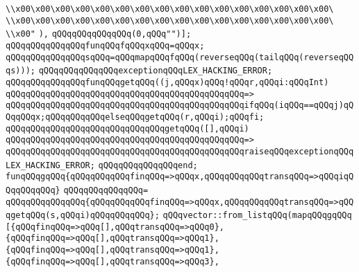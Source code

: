 \verb|\\x00\x00\x00\x00\x00\x00\x00\x00\x00\x00\x00\x00\x00\x00\x00\x00\|\newline
\verb|\\x00\x00\x00\x00\x00\x00\x00\x00\x00\x00\x00\x00\x00\x00\x00\x00\|\newline
\verb|\\x00"|\newline
\verb|),|\newline
\verb|qQQqqQQqqQQqqQQq(0,qQQq"")];|\newline
\verb|qQQqqQQqqQQqqQQqfunqQQqfqQQqxqQQq=qQQqx;|\newline
\verb|qQQqqQQqqQQqqQQqsqQQq=qQQqmapqQQqfqQQq(reverseqQQq(tailqQQq(reverseqQQqs)));|\newline
\verb|qQQqqQQqqQQqqQQqexceptionqQQqLEX_HACKING_ERROR;|\newline
\verb|qQQqqQQqqQQqqQQqfunqQQqgetqQQq((j,qQQqx)qQQq!qQQqr,qQQqi:qQQqInt)|\newline
\verb|qQQqqQQqqQQqqQQqqQQqqQQqqQQqqQQqqQQqqQQqqQQqqQQq=>|\newline
\verb|qQQqqQQqqQQqqQQqqQQqqQQqqQQqqQQqqQQqqQQqqQQqqQQqifqQQq(iqQQq==qQQqj)qQQqqQQqx;qQQqqQQqqQQqelseqQQqgetqQQq(r,qQQqi);qQQqfi;|\newline
\newline
\verb|qQQqqQQqqQQqqQQqqQQqqQQqqQQqqQQqgetqQQq([],qQQqi)|\newline
\verb|qQQqqQQqqQQqqQQqqQQqqQQqqQQqqQQqqQQqqQQqqQQqqQQq=>|\newline
\verb|qQQqqQQqqQQqqQQqqQQqqQQqqQQqqQQqqQQqqQQqqQQqqQQqraiseqQQqexceptionqQQqLEX_HACKING_ERROR;|\newline
\verb|qQQqqQQqqQQqqQQqend;|\newline
\verb|funqQQqgqQQq{qQQqqQQqqQQqfinqQQq=>qQQqx,qQQqqQQqqQQqtransqQQq=>qQQqiqQQqqQQqqQQq}|\newline
\verb|qQQqqQQqqQQqqQQq=|\newline
\verb|qQQqqQQqqQQqqQQq{qQQqqQQqqQQqfinqQQq=>qQQqx,qQQqqQQqqQQqtransqQQq=>qQQqgetqQQq(s,qQQqi)qQQqqQQqqQQq};|\newline
\verb|qQQqvector::from_listqQQq(mapqQQqgqQQq|\newline
\verb|[{qQQqfinqQQq=>qQQq[],qQQqtransqQQq=>qQQq0},|\newline
\verb|{qQQqfinqQQq=>qQQq[],qQQqtransqQQq=>qQQq1},|\newline
\verb|{qQQqfinqQQq=>qQQq[],qQQqtransqQQq=>qQQq1},|\newline
\verb|{qQQqfinqQQq=>qQQq[],qQQqtransqQQq=>qQQq3},|\newline
